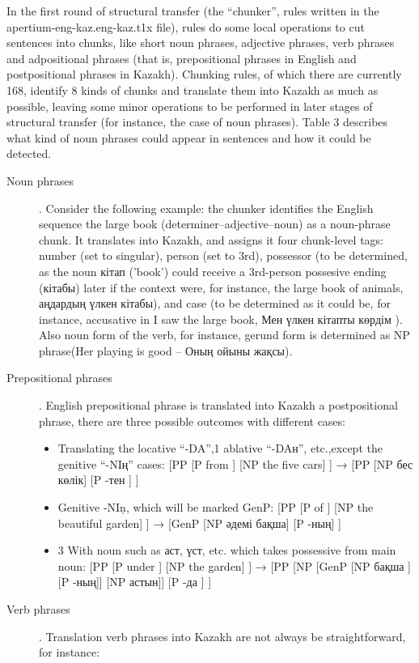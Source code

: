 \documentclass[11pt]{article}
\begin{document}
In the first round of structural transfer (the “chunker”, rules written in the apertium-eng-kaz.eng-kaz.t1x file), rules do some local operations to cut sentences into chunks, like short noun phrases, adjective phrases, verb phrases and adpositional phrases (that is, prepositional phrases in English and postpositional phrases in Kazakh).
Chunking rules, of which there are currently 168, identify 8 kinds of chunks and translate them into Kazakh as much as possible, leaving some minor operations to be performed in later stages of structural transfer (for instance, the case of noun phrases). Table 3 describes what kind of noun phrases could appear in sentences and how it could be detected.


\begin{description}
\item[Noun phrases]. Consider the following example: the chunker identifies the English sequence the large book  (determiner–adjective–noun) as a noun-phrase chunk. It translates into Kazakh, and assigns it four chunk-level tags: number (set to singular), person (set to 3rd), possessor (to be determined, as the noun кітап ('book') could receive a 3rd-person possesive ending (кітабы) later if the context were, for instance, the large book of animals, аңдардың үлкен кітабы), and case (to be determined as it could be, for instance, accusative in I saw the large book, Мен үлкен кітапты көрдім ). Also noun form of the verb, for instance,  gerund form is determined as NP phrase(Her playing is good – Оның ойыны жақсы).
\item[Prepositional phrases]. English prepositional phrase is translated into Kazakh a postpositional phrase, there are three possible outcomes with different cases:
\begin{itemize}
\item Translating the locative “-{D}{A}”,1 ablative “-{D}{A}н”, etc.,except the genitive “-{N}{I}ң” cases: [PP [P from ] [NP the five cars] ] → [PP [NP бес көлік] [P -тен ] ]
\item Genitive -NIņ, which will be marked GenP:  [PP [P of ] [NP the beautiful garden] ] → [GenP [NP әдемі бақша] [P -ның] ] 
\item 3 With noun such as аст, үст, etc. which takes possessive from main noun:  [PP [P under ] [NP the garden] ] → [PP [NP [GenP [NP бақша ][P -ның]] [NP астын]] [P -да ] ]
\end{itemize}
\item[Verb phrases]. Translation verb phrases into Kazakh  are not always be straightforward, for instance: 

\end{description}
\end{document}
